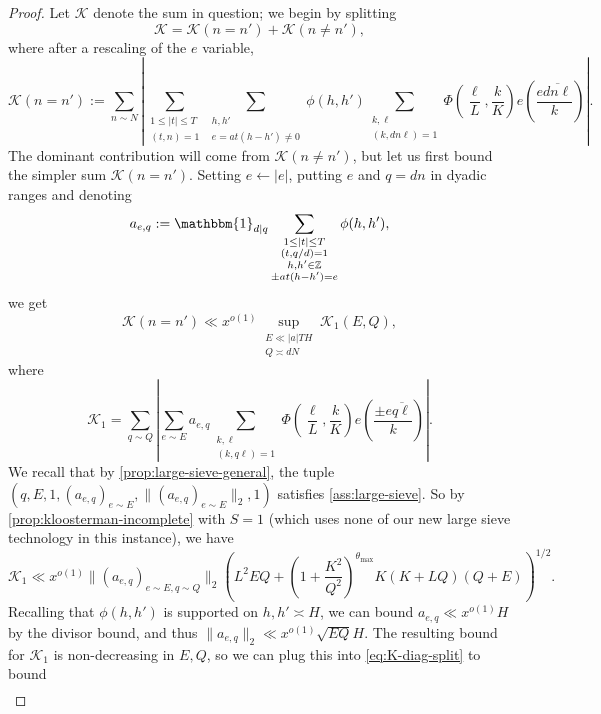 \documentclass[reqno,11pt]{amsart}
\theoremstyle{remark}
\numberwithin{equation}{section}
\newcommand{\Z}{\mathbb{Z}}
\newcommand{\mK}{\mathcal{K}}
\newcommand{\one}{\mathbbm{1}}
\renewcommand{\bar}{\overline}
\begin{document}
\begin{proof}
Let $\mK$ denote the sum in question; we begin by splitting
\begin{equation} \label{eq:K-split-smooth}
    \mK = \mK(n = n') + \mK(n \neq n'),
\end{equation}
where after a rescaling of the $e$ variable,
\[
    \mK(n = n') := 
    \sum_{n \sim N}
    \left \vert
    \sum_{\substack{1 \le |t| \le T \\ (t, n) = 1}}
    \sum_{\substack{h, h' \\ e = at(h - h') \neq 0}} \phi(h, h')
    \sum_{\substack{k, \ell \\ (k, dn\ell) = 1}}
    \Phi\left(\frac{\ell}{L}, \frac{k}{K}\right)
    e\left(\frac{e\bar{dn\ell}}{k}\right) \right \vert.
\]
The dominant contribution will come from $\mK(n \neq n')$, but let us first bound the simpler sum $\mK(n = n')$. Setting $e \gets |e|$, putting $e$ and $q = dn$ in dyadic ranges and denoting
\[
    a_{e,q} := \one_{d \mid q} \sum_{\substack{1 \le |t| \le T \\ (t, q/d) = 1 \\ h,h' \in \Z \\ \pm at(h-h') = e}} \phi(h,h'),
\]
we get
\begin{equation} \label{eq:K-diag-split}
    \mK(n = n') \ll x^{o(1)} \sup_{\substack{E \ll |a|TH \\ Q \asymp dN}}
    \mK_1(E, Q),
\end{equation}
where
\[
    \mK_1 = 
    \sum_{q \sim Q}
    \left \vert
    \sum_{e \sim E} a_{e,q}
    \sum_{\substack{k, \ell \\ (k, q\ell) = 1}}
    \Phi\left(\frac{\ell}{L}, \frac{k}{K}\right)
    e\left(\frac{\pm e\bar{q\ell}}{k}\right) \right \vert.
\]
We recall that by \cref{prop:large-sieve-general}, the tuple $(q, E, 1, (a_{e,q})_{e \sim E}, \|(a_{e,q})_{e \sim E}\|_2, 1)$ satisfies \cref{ass:large-sieve}. So by \cref{prop:kloosterman-incomplete} with $S = 1$ (which uses none of our new large sieve technology in this instance), we have
\[
    \mK_1 \ll x^{o(1)} \|(a_{e,q})_{e \sim E, q \sim Q} \|_2 \left(L^2 E Q + \left(1 + \frac{K^2}{Q^2}\right)^{\theta_{\max}} K (K + LQ)(Q + E) \right)^{1/2}.
\]
Recalling that $\phi(h, h')$ is supported on $h, h' \asymp H$, we can bound $a_{e,q} \ll x^{o(1)} H$ by the divisor bound, and thus $\|a_{e,q}\|_2 \ll x^{o(1)} \sqrt{EQ} H$. The resulting bound for $\mK_1$ is non-decreasing in $E, Q$, so we can plug this into \cref{eq:K-diag-split} to bound
\[
\begin{aligned}

\end{aligned}\]
\end{proof}
\end{document}
